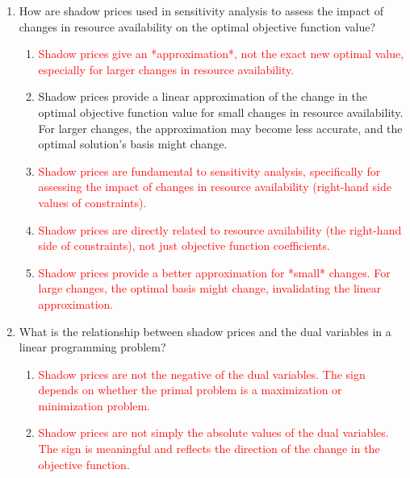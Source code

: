 \documentclass{article}%
\newcommand{\incorrect}[1]{\textcolor{red}{#1}}
\begin{document}
\begin{enumerate}
\begin{enumerate}
\item \incorrect{A shadow price of 0 doesn't necessarily mean the constraint is redundant.  It simply means it's not actively limiting the optimal solution.}%
\item \incorrect{An infeasible constraint would typically lead to an infeasible dual problem, not a shadow price of 0 for a specific constraint.}%
\item \incorrect{The shadow price of 0 is directly related to the corresponding dual constraint via complementary slackness.}%
\end{enumerate}%
\vspace{1em}%
\item How are shadow prices used in sensitivity analysis to assess the impact of changes in resource availability on the optimal objective function value?%
\begin{enumerate}%
\item \incorrect{Shadow prices give an *approximation*, not the exact new optimal value, especially for larger changes in resource availability.}%
\item Shadow prices provide a linear approximation of the change in the optimal objective function value for small changes in resource availability.  For larger changes, the approximation may become less accurate, and the optimal solution's basis might change.%
\item \incorrect{Shadow prices are fundamental to sensitivity analysis, specifically for assessing the impact of changes in resource availability (right-hand side values of constraints).}%
\item \incorrect{Shadow prices are directly related to resource availability (the right-hand side of constraints), not just objective function coefficients.}%
\item \incorrect{Shadow prices provide a better approximation for *small* changes.  For large changes, the optimal basis might change, invalidating the linear approximation.}%
\end{enumerate}%
\vspace{1em}%
\item What is the relationship between shadow prices and the dual variables in a linear programming problem?%
\begin{enumerate}%
\item \incorrect{Shadow prices are not the negative of the dual variables.  The sign depends on whether the primal problem is a maximization or minimization problem.}%
\item \incorrect{Shadow prices are not simply the absolute values of the dual variables.  The sign is meaningful and reflects the direction of the change in the objective function.}%

\end{enumerate}
\end{enumerate}
\end{document}
